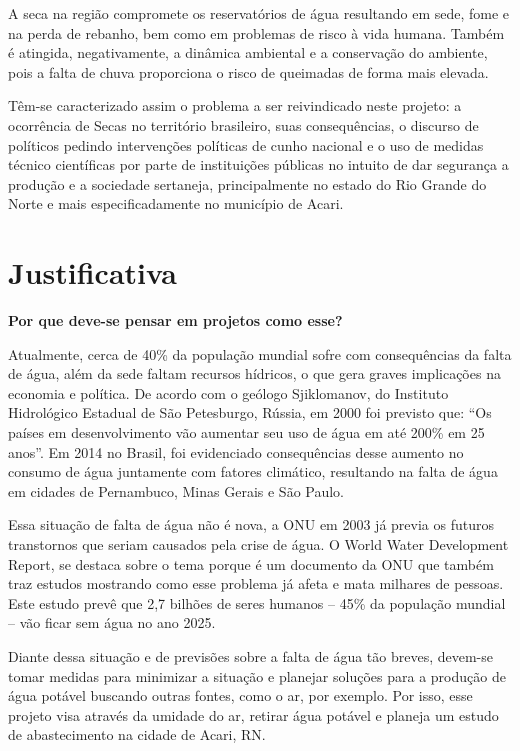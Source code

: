 A seca na região compromete os reservatórios de água resultando em sede, fome e na perda de rebanho, bem como em problemas
de risco à vida humana. Também é atingida, negativamente, a dinâmica ambiental e a conservação do ambiente, pois a falta de 
chuva proporciona o risco de queimadas de forma mais elevada.

Têm-se caracterizado assim o problema a ser reivindicado neste projeto: a ocorrência de Secas no território brasileiro,
suas consequências, o discurso de políticos pedindo intervenções políticas de cunho nacional e o uso de medidas técnico 
científicas por parte de instituições públicas no intuito de dar segurança a produção e a sociedade sertaneja, principalmente 
no estado do Rio Grande do Norte e mais especificadamente no município de Acari.


\section{Justificativa}

\textbf{Por que deve-se pensar em projetos como esse?}

Atualmente, cerca de 40\% da população mundial sofre com consequências da falta de água, além da sede faltam recursos hídricos,
o que gera graves implicações na economia e política. De acordo com o geólogo Sjiklomanov, do Instituto Hidrológico Estadual 
de São Petesburgo, Rússia, em 2000 foi previsto que: “Os países em desenvolvimento vão aumentar seu uso de água em até 200\% em
25 anos”. Em 2014 no Brasil, foi evidenciado consequências desse aumento no consumo de água juntamente com fatores climático,
resultando na falta de água em cidades de Pernambuco, Minas Gerais e São Paulo.

Essa situação de falta de água não é nova, a ONU em 2003 já previa os futuros transtornos que seriam causados pela crise de 
água. O World Water Development Report, se destaca sobre o tema porque é um documento da ONU que também traz estudos mostrando
como esse problema já afeta e mata milhares de pessoas. Este estudo prevê que 2,7 bilhões de seres humanos – 45\% da população 
mundial – vão ficar sem água no ano 2025.

Diante dessa situação e de previsões sobre a falta de água tão breves, devem-se tomar medidas para minimizar a situação e
planejar soluções para a produção de água potável buscando outras fontes, como o ar, por exemplo. Por isso, esse projeto visa
através da umidade do ar, retirar água potável e planeja um estudo de abastecimento na cidade de Acari, RN.

